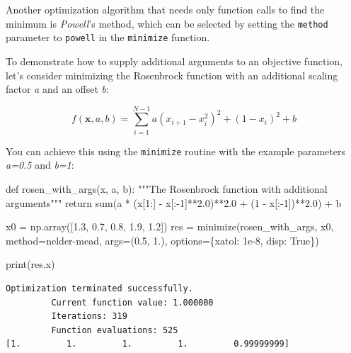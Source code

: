 \documentclass[
  letterpaper,
  DIV=11,
  numbers=noendperiod]{scrreprt}
\newenvironment{Shaded}{\begin{snugshade}}{\end{snugshade}}
\newcommand{\BuiltInTok}[1]{\textcolor[rgb]{0.00,0.23,0.31}{#1}}
\newcommand{\CommentTok}[1]{\textcolor[rgb]{0.37,0.37,0.37}{#1}}
\newcommand{\ControlFlowTok}[1]{\textcolor[rgb]{0.00,0.23,0.31}{#1}}
\newcommand{\DecValTok}[1]{\textcolor[rgb]{0.68,0.00,0.00}{#1}}
\newcommand{\FloatTok}[1]{\textcolor[rgb]{0.68,0.00,0.00}{#1}}
\newcommand{\KeywordTok}[1]{\textcolor[rgb]{0.00,0.23,0.31}{#1}}
\newcommand{\NormalTok}[1]{\textcolor[rgb]{0.00,0.23,0.31}{#1}}
\newcommand{\OperatorTok}[1]{\textcolor[rgb]{0.37,0.37,0.37}{#1}}
\newcommand{\StringTok}[1]{\textcolor[rgb]{0.13,0.47,0.30}{#1}}
\newcommand{\VariableTok}[1]{\textcolor[rgb]{0.07,0.07,0.07}{#1}}
\begin{document}
Another optimization algorithm that needs only function calls to find
the minimum is \emph{Powell}'s method, which can be selected by setting
the \texttt{method} parameter to
\texttt{\textquotesingle{}powell\textquotesingle{}} in the
\texttt{minimize} function.

To demonstrate how to supply additional arguments to an objective
function, let's consider minimizing the Rosenbrock function with an
additional scaling factor \emph{a} and an offset \emph{b}:

\[
f(\mathbf{x}, a, b) = \sum_{i=1}^{N-1} a (x_{i+1} - x_i^2)^2 + (1 - x_i)^2 + b
\]

You can achieve this using the \texttt{minimize} routine with the
example parameters \emph{a=0.5} and \emph{b=1}:

\begin{Shaded}
\begin{Highlighting}[]
\KeywordTok{def}\NormalTok{ rosen\_with\_args(x, a, b):}
    \CommentTok{"""The Rosenbrock function with additional arguments"""}
    \ControlFlowTok{return} \BuiltInTok{sum}\NormalTok{(a }\OperatorTok{*}\NormalTok{ (x[}\DecValTok{1}\NormalTok{:] }\OperatorTok{{-}}\NormalTok{ x[:}\OperatorTok{{-}}\DecValTok{1}\NormalTok{]}\OperatorTok{**}\FloatTok{2.0}\NormalTok{)}\OperatorTok{**}\FloatTok{2.0} \OperatorTok{+}\NormalTok{ (}\DecValTok{1} \OperatorTok{{-}}\NormalTok{ x[:}\OperatorTok{{-}}\DecValTok{1}\NormalTok{])}\OperatorTok{**}\FloatTok{2.0}\NormalTok{) }\OperatorTok{+}\NormalTok{ b}

\NormalTok{x0 }\OperatorTok{=}\NormalTok{ np.array([}\FloatTok{1.3}\NormalTok{, }\FloatTok{0.7}\NormalTok{, }\FloatTok{0.8}\NormalTok{, }\FloatTok{1.9}\NormalTok{, }\FloatTok{1.2}\NormalTok{])}
\NormalTok{res }\OperatorTok{=}\NormalTok{ minimize(rosen\_with\_args, x0, method}\OperatorTok{=}\StringTok{\textquotesingle{}nelder{-}mead\textquotesingle{}}\NormalTok{,}
\NormalTok{               args}\OperatorTok{=}\NormalTok{(}\FloatTok{0.5}\NormalTok{, }\FloatTok{1.}\NormalTok{), options}\OperatorTok{=}\NormalTok{\{}\StringTok{\textquotesingle{}xatol\textquotesingle{}}\NormalTok{: }\FloatTok{1e{-}8}\NormalTok{, }\StringTok{\textquotesingle{}disp\textquotesingle{}}\NormalTok{: }\VariableTok{True}\NormalTok{\})}

\BuiltInTok{print}\NormalTok{(res.x)}
\end{Highlighting}
\end{Shaded}

\begin{verbatim}
Optimization terminated successfully.
         Current function value: 1.000000
         Iterations: 319
         Function evaluations: 525
[1.         1.         1.         1.         0.99999999]
\end{verbatim}
\end{document}
